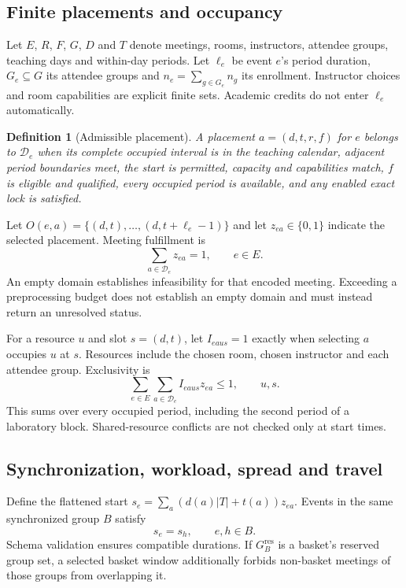 \documentclass[pdflatex,sn-mathphys-num]{sn-jnl}
\theoremstyle{thmstyleone}
\theoremstyle{thmstyletwo}
\theoremstyle{thmstylethree}
\newtheorem{definition}{Definition}
\begin{document}
\subsection{Finite placements and occupancy}

Let $E$, $R$, $F$, $G$, $D$ and $T$ denote meetings, rooms, instructors, attendee groups, teaching days and within-day periods. Let $\ell_e$ be event $e$'s period duration, $G_e\subseteq G$ its attendee groups and $n_e=\sum_{g\in G_e}n_g$ its enrollment. Instructor choices and room capabilities are explicit finite sets. Academic credits do not enter $\ell_e$ automatically.

\begin{definition}[Admissible placement]
A placement $a=(d,t,r,f)$ for $e$ belongs to $\mathcal{D}_e$ when its complete occupied interval is in the teaching calendar, adjacent period boundaries meet, the start is permitted, capacity and capabilities match, $f$ is eligible and qualified, every occupied period is available, and any enabled exact lock is satisfied.
\end{definition}

Let $O(e,a)=\{(d,t),\ldots,(d,t+\ell_e-1)\}$ and let $z_{ea}\in\{0,1\}$ indicate the selected placement. Meeting fulfillment is
\begin{equation}
\sum_{a\in\mathcal{D}_e}z_{ea}=1,\qquad e\in E.\label{eq:fulfillment}
\end{equation}
An empty domain establishes infeasibility for that encoded meeting. Exceeding a preprocessing budget does not establish an empty domain and must instead return an unresolved status.

For a resource $u$ and slot $s=(d,t)$, let $I_{eau s}=1$ exactly when selecting $a$ occupies $u$ at $s$. Resources include the chosen room, chosen instructor and each attendee group. Exclusivity is
\begin{equation}
\sum_{e\in E}\sum_{a\in\mathcal{D}_e}I_{eau s}z_{ea}\leq1,
\qquad u,s.\label{eq:exclusive}
\end{equation}
This sums over every occupied period, including the second period of a laboratory block. Shared-resource conflicts are not checked only at start times.

\subsection{Synchronization, workload, spread and travel}

Define the flattened start $s_e=\sum_a(d(a)|T|+t(a))z_{ea}$. Events in the same synchronized group $B$ satisfy
\begin{equation}
s_e=s_h,\qquad e,h\in B.\label{eq:sync}
\end{equation}
Schema validation ensures compatible durations. If $G_B^{\mathrm{res}}$ is a basket's reserved group set, a selected basket window additionally forbids non-basket meetings of those groups from overlapping it.
\end{document}
